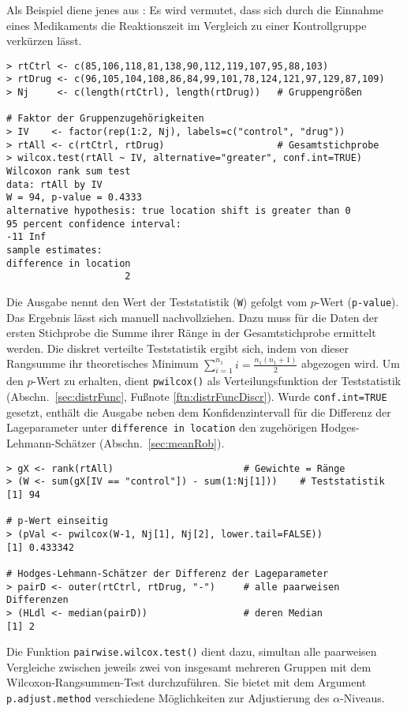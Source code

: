 Als Beispiel diene jenes aus : Es wird vermutet, dass sich durch die Einnahme eines Medikaments die Reaktionszeit im Vergleich zu einer Kontrollgruppe verkürzen lässt.
\begin{lstlisting}
> rtCtrl <- c(85,106,118,81,138,90,112,119,107,95,88,103)
> rtDrug <- c(96,105,104,108,86,84,99,101,78,124,121,97,129,87,109)
> Nj     <- c(length(rtCtrl), length(rtDrug))   # Gruppengrößen

# Faktor der Gruppenzugehörigkeiten
> IV    <- factor(rep(1:2, Nj), labels=c("control", "drug"))
> rtAll <- c(rtCtrl, rtDrug)                    # Gesamtstichprobe
> wilcox.test(rtAll ~ IV, alternative="greater", conf.int=TRUE)
Wilcoxon rank sum test
data: rtAll by IV
W = 94, p-value = 0.4333
alternative hypothesis: true location shift is greater than 0
95 percent confidence interval:
-11 Inf
sample estimates:
difference in location
                     2
\end{lstlisting}

Die Ausgabe nennt den Wert der Teststatistik (\lstinline!W!) gefolgt vom $p$-Wert (\lstinline!p-value!). Das Ergebnis lässt sich manuell nachvollziehen. Dazu muss für die Daten der ersten Stichprobe die Summe ihrer Ränge in der Gesamtstichprobe ermittelt werden. Die diskret verteilte Teststatistik ergibt sich, indem von dieser Rangsumme ihr theoretisches Minimum $\sum_{i=1}^{n_{1}} i = \frac{n_{1} (n_{1} + 1)}{2}$ abgezogen wird. Um den $p$-Wert zu erhalten, dient \lstinline!pwilcox()! als Verteilungsfunktion der Teststatistik (Abschn.\ \ref{sec:distrFunc}, Fußnote \ref{ftn:distrFuncDiscr}). Wurde \lstinline!conf.int=TRUE! gesetzt, enthält die Ausgabe neben dem Konfidenzintervall für die Differenz der Lageparameter unter \lstinline!difference in location! den zugehörigen Hodges-Lehmann-Schätzer (Abschn.\ \ref{sec:meanRob}).
\begin{lstlisting}
> gX <- rank(rtAll)                       # Gewichte = Ränge
> (W <- sum(gX[IV == "control"]) - sum(1:Nj[1]))    # Teststatistik
[1] 94

# p-Wert einseitig
> (pVal <- pwilcox(W-1, Nj[1], Nj[2], lower.tail=FALSE))
[1] 0.433342

# Hodges-Lehmann-Schätzer der Differenz der Lageparameter
> pairD <- outer(rtCtrl, rtDrug, "-")     # alle paarweisen Differenzen
> (HLdl <- median(pairD))                 # deren Median
[1] 2
\end{lstlisting}

Die Funktion \lstinline!pairwise.wilcox.test()! dient dazu, simultan alle paarweisen Vergleiche zwischen jeweils zwei von insgesamt mehreren Gruppen mit dem Wilcoxon-Rangsummen-Test durchzuführen. Sie bietet mit dem Argument \lstinline!p.adjust.method! verschiedene Möglichkeiten zur Adjustierung des $\alpha$-Niveaus.

